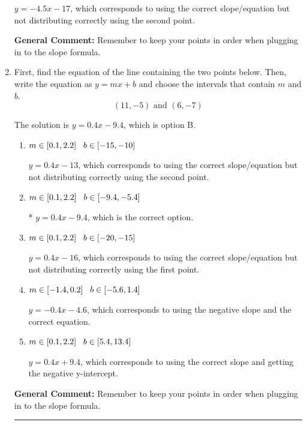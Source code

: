 \documentclass{extbook}[14pt]
\newcommand{\litem}[1]{\item #1

\rule{\textwidth}{0.4pt}}
\begin{document}
\begin{enumerate}
{\begin{enumerate}[label=\Alph*.]
 $y = -4.5x -17$, which corresponds to using the correct slope/equation but not distributing correctly using the second point.
\end{enumerate}

\textbf{General Comment:} Remember to keep your points in order when plugging in to the slope formula.
}
\litem{
First, find the equation of the line containing the two points below. Then, write the equation as $ y=mx+b $ and choose the intervals that contain $m$ and $b$.
\[ (11, -5) \text{ and } (6, -7) \]

The solution is \( y = 0.4x -9.4 \), which is option B.\begin{enumerate}[label=\Alph*.]
\item \( m \in [0.1, 2.2] \hspace*{3mm} b \in [-15, -10] \)

 $y = 0.4x -13$, which corresponds to using the correct slope/equation but not distributing correctly using the second point.
\item \( m \in [0.1, 2.2] \hspace*{3mm} b \in [-9.4, -5.4] \)

* $y = 0.4x -9.4$, which is the correct option.
\item \( m \in [0.1, 2.2] \hspace*{3mm} b \in [-20, -15] \)

 $y = 0.4x -16$, which corresponds to using the correct slope/equation but not distributing correctly using the first point.
\item \( m \in [-1.4, 0.2] \hspace*{3mm} b \in [-5.6, 1.4] \)

 $y = -0.4x -4.6$, which corresponds to using the negative slope and the correct equation.
\item \( m \in [0.1, 2.2] \hspace*{3mm} b \in [5.4, 13.4] \)

 $y = 0.4x + 9.4$, which corresponds to using the correct slope and getting the negative y-intercept.
\end{enumerate}

\textbf{General Comment:} Remember to keep your points in order when plugging in to the slope formula.
}
\end{enumerate}
\end{document}
